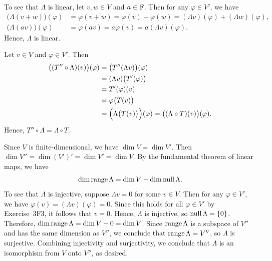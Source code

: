 \begin{solution}\leavevmode
\begin{parts}
\item To see that $\Lambda$ is linear, let $v,w\in V$ and $a\in\mathbb{F}$. Then for
  any $\varphi\in V'$, we have
  \begin{align*}
  \bigl(\Lambda(v+w)\bigr)(\varphi) &= \varphi(v+w) = \varphi(v)+\varphi(w)
    = (\Lambda v)(\varphi)+(\Lambda w)(\varphi),\\
  \bigl(\Lambda(av)\bigr)(\varphi) &= \varphi(av) = a\varphi(v)
    = a(\Lambda v)(\varphi).
  \end{align*}
  Hence, $\Lambda$ is linear.
\item Let $v\in V$ and $\varphi\in V'$. Then
  \begin{align*}
  \bigl((T''\circ\Lambda)(v)\bigr)(\varphi)
   &= \bigl(T''(\Lambda v)\bigr)(\varphi)\\
   &= (\Lambda v)\bigl(T'(\varphi)\bigr)\\
   &= T'(\varphi)(v)\\
   &= \varphi\bigl(T(v)\bigr)\\
   &= \Bigl(\Lambda\bigl(T(v)\bigr)\Bigr)(\varphi)
    = \bigl((\Lambda\circ T)(v)\bigr)(\varphi).
  \end{align*}
  Hence, $T''\circ\Lambda=\Lambda\circ T$.
\item Since $V$ is finite-dimensional, we have $\dim V=\dim V'$. Then
  $\dim V''=\dim(V')'=\dim V'=\dim V$. By the fundamental theorem of linear
  maps, we have
  \[ \operatorname{dim}\operatorname{range}\Lambda = \operatorname{dim} V-\operatorname{dim}\operatorname{null}\Lambda. \]
  To see that $\Lambda$ is injective, suppose $\Lambda v=0$ for some $v\in V$.
  Then for any $\varphi\in V'$, we have $\varphi(v)=(\Lambda v)(\varphi)=0$.
  Since this holds for all $\varphi\in V'$ by Exercise~3F3, it follows that
  $v=0$. Hence, $\Lambda$ is injective, so $\operatorname{null}\Lambda=\{0\}$. Therefore,
  $\operatorname{dim}\operatorname{range}\Lambda=\operatorname{dim} V-0=\operatorname{dim} V$. Since $\operatorname{range}\Lambda$ is a subspace of
  $V''$ and has the same dimension as $V''$, we conclude that
  $\operatorname{range}\Lambda=V''$, so $\Lambda$ is surjective. Combining injectivity and
  surjectivity, we conclude that $\Lambda$ is an isomorphism from $V$ onto
  $V''$, as desired.
\end{parts}
\end{solution}

